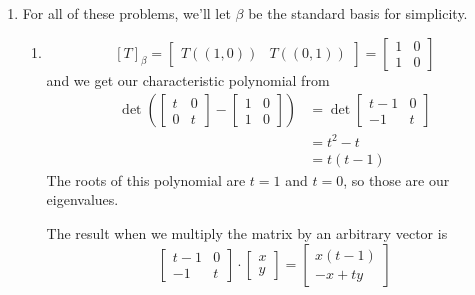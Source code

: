 \documentclass[12pt]{article}
\begin{document}
\begin{enumerate}
      \item For all of these problems, we'll let $\beta$ be the standard basis for simplicity.
            \begin{enumerate}
                  \item \[[T]_\beta=\begin{bmatrix}
                                    T((1, 0)) & T((0, 1))
                              \end{bmatrix}=\begin{bmatrix}
                                    1 & 0 \\
                                    1 & 0
                              \end{bmatrix}\]
                        and we get our characteristic polynomial from
                        \begin{align*}
                              \det \left(\begin{bmatrix}
                                               t & 0 \\
                                               0 & t
                                         \end{bmatrix}-\begin{bmatrix}
                                                             1 & 0 \\
                                                             1 & 0
                                                       \end{bmatrix}\right)
                               & = \det \begin{bmatrix}
                                              t-1 & 0 \\
                                              -1  & t
                                        \end{bmatrix} \\
                               & = t^2-t               \\
                               & = t(t-1)
                        \end{align*}
                        The roots of this polynomial are $t=1$ and $t=0$, so those are our eigenvalues.

                        The result when we multiply the matrix by an arbitrary vector is
                        \[\begin{bmatrix}
                                    t-1 & 0 \\
                                    -1  & t
                              \end{bmatrix} \cdot \begin{bmatrix}
                                    x \\ y
                              \end{bmatrix}=\begin{bmatrix}
                                    x(t-1) \\ -x+ty
                              \end{bmatrix}\]


\end{enumerate}
\end{enumerate}
\end{document}

